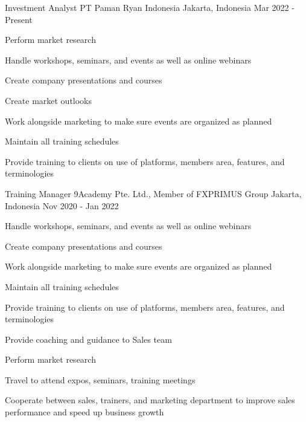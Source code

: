 

\begin{cventries}

  \cventry
    {Investment Analyst} %
    {PT Paman Ryan Indonesia} %
    {Jakarta, Indonesia} %
    {Mar 2022 - Present} %
    {
      \begin{cvitems} %
        \item {Perform market research}
        \item {Handle workshops, seminars, and events as well as online webinars}
        \item {Create company presentations and courses}
        \item {Create market outlooks}
        \item {Work alongside marketing to make sure events are organized as planned}
        \item {Maintain all training schedules}
        \item {Provide training to clients on use of platforms, members area, features, and terminologies}
      \end{cvitems}
    }

  \cventry
    {Training Manager} %
    {9Academy Pte. Ltd., Member of FXPRIMUS Group } %
    {Jakarta, Indonesia} %
    {Nov 2020 - Jan 2022} %
    {
      \begin{cvitems} %
        \item {Handle workshops, seminars, and events as well as online webinars}
        \item {Create company presentations and courses}
        \item {Work alongside marketing to make sure events are organized as planned}
        \item {Maintain all training schedules}
        \item {Provide training to clients on use of platforms, members area, features, and terminologies}
        \item {Provide coaching and guidance to Sales team}
        \item {Perform market research}
        \item {Travel to attend expos, seminars, training meetings}
        \item {Cooperate between sales, trainers, and marketing department to improve sales performance and speed up business growth}
      \end{cvitems}
    }


\end{cventries}

